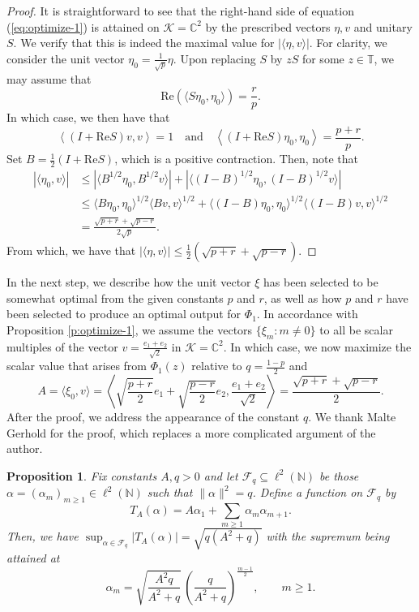 \documentclass[10pt]{amsart}
\newcommand{\bC}{{\mathbb{C}}}
\newcommand{\bN}{{\mathbb{N}}}
\newcommand{\bT}{{\mathbb{T}}}
\newcommand{\F}{{\mathcal{F}}}
\newcommand{\K}{{\mathcal{K}}}
\newtheorem{proposition}[theorem]{Proposition}
\begin{document}
\begin{proof}
    It is straightforward to see that the right-hand side of equation (\ref{eq:optimize-1}) is attained on $\K=\bC^2$ by the prescribed vectors $\eta, v$ and unitary $S$. We verify that this is indeed the maximal value for $|\langle\eta,v\rangle|$. For clarity, we consider the unit vector $\eta_0 = \frac{1}{\sqrt{p}}\eta$. Upon replacing $S$ by $zS$ for some $z\in\bT$, we may assume that
    \[
        \text{Re}(\langle S \eta_0, \eta_0\rangle) = \frac{r}{p}.
    \]
    In which case, we then have that
    \[
        \left\langle  (I+\text{Re}S)v, v \right\rangle = 1 \quad \text{and} \quad \left\langle (I+\text{Re}S)\eta_0, \eta_0 \right\rangle = \frac{p+r}{p}.
    \]
    Set $B=\frac{1}{2}(I+\text{Re}S)$, which is a positive contraction. Then, note that
    \begin{align*}
        |\langle\eta_0, v\rangle| & \leq |\langle B^{1/2} \eta_0,  B^{1/2}v\rangle| + |\langle (I-B)^{1/2}\eta_0, (I-B)^{1/2} v\rangle|\\
        & \leq \langle B\eta_0, \eta_0\rangle^{1/2} \langle Bv, v\rangle^{1/2} + \langle (I-B) \eta_0, \eta_0\rangle^{1/2}\langle (I-B)v, v\rangle^{1/2}\\
        & = \frac{\sqrt{p+r} + \sqrt{p-r}}{2\sqrt{p}}.
    \end{align*}
    From which, we have that $|\langle \eta, v\rangle| \leq \frac{1}{2}(\sqrt{p+r}+\sqrt{p-r})$.
\end{proof}

In the next step, we describe how the unit vector $\xi$ has been selected to be somewhat optimal from the given constants $p$ and $r$, as well as how $p$ and $r$ have been selected to produce an optimal output for $\Phi_1$. In accordance with Proposition \ref{p:optimize-1}, we assume the vectors $\{\xi_m: m\neq0\}$ to all be scalar multiples of the vector $v=\frac{e_1+e_2}{\sqrt{2}}$ in $\K=\bC^2$. In which case, we now maximize the scalar value that arises from $\Phi_1(z)$ relative to $q = \frac{1-p}{2}$ and
\[
     A= \langle \xi_0, v\rangle = \left\langle \sqrt{\frac{p+r}{2}}e_1 + \sqrt{\frac{p-r}{2}}e_2, \frac{e_1+e_2}{\sqrt{2}}\right\rangle = \frac{\sqrt{p+r}+\sqrt{p-r}}{2}.
\]
After the proof, we address the appearance of the constant $q$. We thank Malte Gerhold for the proof, which replaces a more complicated argument of the author.

\begin{proposition}\label{p:optimize-2}
    Fix constants $A,q>0$ and let $\F_q\subseteq\ell^2(\bN)$ be those $\alpha = (\alpha_m)_{m\geq 1}\in\ell^2(\bN)$ such that $\|\alpha\|^2 = q$. Define a function on $\F_q$ by
    \[
        T_A(\alpha) = A\alpha_1 + \sum_{m\geq1}\alpha_m\alpha_{m+1}.
    \]
    Then, we have $\sup_{\alpha\in\F_q}|T_A(\alpha)| = \sqrt{q(A^2+q)}$ with the supremum being attained at
    \[
        \alpha_m=\sqrt{\frac{A^2q}{A^2+q}}\,\left( \frac{q}{A^2+q}\right)^{\frac{m-1}{2}}, \qquad m\geq 1.
    \]
\end{proposition}
\end{document}
